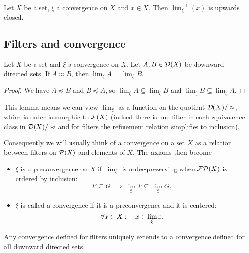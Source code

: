 \begin{lemma}
Let $X$ be a set, $\xi$ a convergence on $X$ and $x\in X$. Then $\lim_\xi^{-1}(x)$ is upwards closed.
\end{lemma}

\subsection{Filters and convergence}
\begin{lemma}
Let $X$ be a set and $\xi$ a convergence on $X$. Let $A,B\in \operatorname{\mathcal{D}}(X)$ be downward directed sets. If $A \approx B$, then $\lim_\xi A = \lim_\xi B$.
\end{lemma}
\begin{proof}
We have $A \preceq B$ and $B \preceq A$, so $\lim_\xi A \subseteq \lim_\xi B$ and $\lim_\xi B \subseteq \lim_\xi A$.
\end{proof}
This lemma means we can view $\lim_\xi$ as a function on the quotient $\operatorname{\mathcal{D}}(X) /\approx$, which is order isomorphic to $\operatorname{\mathcal{F}}(X)$ (indeed there is one filter in each equivalence class in $\operatorname{\mathcal{D}}(X) /\approx$ and for filters the refinement relation simplifies to inclusion).

Consequently we will usually think of a convergence on a set $X$ as a relation between filters on $\operatorname{\mathcal{P}}(X)$ and elements of $X$. The axioms then become
\begin{itemize}
\item $\xi$ is a preconvergence on $X$ if $\lim_\xi$ is order-preserving when $\operatorname{\mathcal{FP}}(X)$ is ordered by inclusion:
\[ F \subseteq G \implies \lim_\xi F \subseteq \lim_\xi G; \]
\item $\xi$ is called a convergence if it is a preconvergence and it is centered:
\[ \forall x\in X: \quad x\in \lim_\xi \dot{x}. \]
\end{itemize}

Any convergence defined for filters uniquely extends to a convergence defined for all downward directed sets. 

